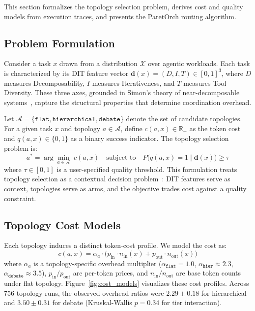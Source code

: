 \documentclass{article}
\begin{document}
This section formalizes the topology selection problem, derives cost and quality models from execution traces, and presents the ParetOrch routing algorithm.

\subsection{Problem Formulation}

Consider a task $x$ drawn from a distribution $\mathcal{X}$ over agentic workloads. Each task is characterized by its DIT feature vector $\mathbf{d}(x) = (D, I, T) \in [0,1]^3$, where $D$ measures Decomposability, $I$ measures Iterativeness, and $T$ measures Tool Diversity. These three axes, grounded in Simon's theory of near-decomposable systems~\cite{simon1962complexity}, capture the structural properties that determine coordination overhead.

Let $\mathcal{A} = \{\texttt{flat}, \texttt{hierarchical}, \texttt{debate}\}$ denote the set of candidate topologies. For a given task $x$ and topology $a \in \mathcal{A}$, define $c(a, x) \in \mathbb{R}_{+}$ as the token cost and $q(a, x) \in \{0, 1\}$ as a binary success indicator. The topology selection problem is:
\begin{equation}
a^{*} = \arg\min_{a \in \mathcal{A}} \; c(a, x) \quad \text{subject to} \quad P\bigl(q(a, x) = 1 \mid \mathbf{d}(x)\bigr) \geq \tau
\label{eq:objective}
\end{equation}
where $\tau \in [0, 1]$ is a user-specified quality threshold. This formulation treats topology selection as a contextual decision problem~\cite{agrawal2013contextual_ts}: DIT features serve as context, topologies serve as arms, and the objective trades cost against a quality constraint.

\subsection{Topology Cost Models}

Each topology induces a distinct token-cost profile. We model the cost as:
\begin{equation}
c(a, x) = \alpha_a \cdot \bigl(p_{\text{in}} \cdot n_{\text{in}}(x) + p_{\text{out}} \cdot n_{\text{out}}(x)\bigr)
\label{eq:cost}
\end{equation}
where $\alpha_a$ is a topology-specific overhead multiplier ($\alpha_{\texttt{flat}} = 1.0$, $\alpha_{\texttt{hier}} \approx 2.3$, $\alpha_{\texttt{debate}} \approx 3.5$), $p_{\text{in}}/p_{\text{out}}$ are per-token prices, and $n_{\text{in}}/n_{\text{out}}$ are base token counts under flat topology. Figure~\ref{fig:cost_models} visualizes these cost profiles. Across 756 topology runs, the observed overhead ratios were $2.29 \pm 0.18$ for hierarchical and $3.50 \pm 0.31$ for debate (Kruskal-Wallis $p = 0.34$ for tier interaction).
\end{document}
